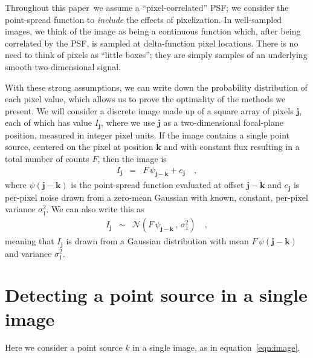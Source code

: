 \documentclass[letterpaper,preprint]{aastex62}
\newcommand{\doctype}{paper}
\newcommand{\equationname}{equation}
\newcommand{\eqnref}[1]{\mbox{\equationname~\ref{#1}}}
\newcommand{\drawnfrom}{\sim}
\newcommand{\gaussianN}{\mathcal{N}}
\newcommand{\gaussx}[2]{\gaussianN\!\left(#1 \, , \, #2\right)}
\newcommand{\psf}{\psi}
\newcommand{\psfat}[1]{\psf_{#1}}
\newcommand{\noise}{e}
\renewcommand{\vec}[1]{\boldsymbol{#1}}
\newcommand{\jvec}{\vec{j}}
\newcommand{\kvec}{\vec{k}}
\begin{document}
Throughout this \doctype\ we assume a ``pixel-correlated'' PSF; we
consider the point-spread function to \emph{include} the effects of
pixelization.  In well-sampled images, we think of the image as being
a continuous function which, after being correlated by the PSF, is
sampled at delta-function pixel locations.  There is no need to think
of pixels as ``little boxes''; they are simply samples of an
underlying smooth two-dimensional signal.



With these strong assumptions, we can write down the probability
distribution of each pixel value, which allows us to prove the
optimality of the methods we present.
%
We will consider a discrete image made up of a square array of pixels
$\jvec$, each of which has value $I_{\jvec}$, where we
use $\jvec$ as a two-dimensional focal-plane position, measured in
integer pixel units.
%
If the image contains a single point source, centered on
the pixel at position $\kvec$ and with constant flux resulting in a
total number of counts $F$, then the image is
\begin{eqnarray}
  I_{\jvec} &=& F \, \psfat{\jvec - \kvec} + \noise_{\jvec} \quad ,
  \label{eqn:image}
\end{eqnarray}
where $\psi(\jvec-\kvec)$ is the point-spread function evaluated at
offset $\jvec-\kvec$ and $\noise_{\jvec}$ is per-pixel noise drawn
from a zero-mean Gaussian with known, constant, per-pixel variance $\sigma_1^2$.
%
We can also write this as
\begin{eqnarray}
  I_{\jvec} &\drawnfrom& \gaussx{F \, \psfat{\jvec - \kvec}}{\sigma_1^2}
  \quad ,
\end{eqnarray}
meaning that $I_{\jvec}$ is drawn from a Gaussian distribution with
mean $F\, \psf(\jvec - \kvec)$ and variance $\sigma_1^2$.


\section{Detecting a point source in a single image}


Here we consider a point source $k$ in a single image, as in
\eqnref{eqn:image}.
\end{document}
